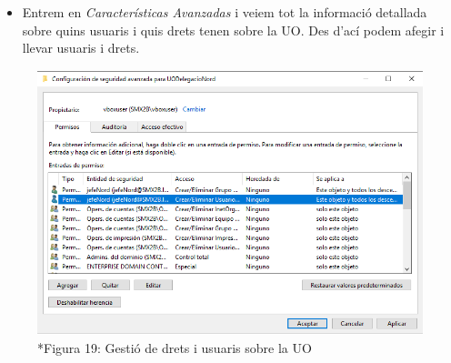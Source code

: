 \documentclass[
  a4paper,
]{article}
\providecommand{\tightlist}{%
  \setlength{\itemsep}{0pt}\setlength{\parskip}{0pt}}
\begin{document}
\begin{itemize}
\tightlist
\item
  Entrem en \emph{Características Avanzadas} i veiem tot la informació
  detallada sobre quins usuaris i quis drets tenen sobre la UO. Des
  d'ací podem afegir i llevar usuaris i drets.
\end{itemize}

\begin{figure}
\centering
\includegraphics{png/derechosUOAvanzado.png}
\caption{*Figura 19: Gestió de drets i usuaris sobre la UO}
\end{figure}
\end{document}
